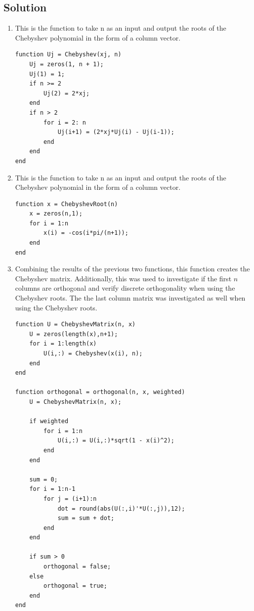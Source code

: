 \documentclass{article}
\begin{document}
\subsection{Solution}
\begin{enumerate}
    \item This is the function to take n as an input and output the roots of the Chebyshev polynomial in the form of a column vector.
    \begin{lstlisting}[style=Matlab-editor]
function Uj = Chebyshev(xj, n)
    Uj = zeros(1, n + 1);
    Uj(1) = 1;
    if n >= 2
        Uj(2) = 2*xj;
    end
    if n > 2
        for i = 2: n
            Uj(i+1) = (2*xj*Uj(i) - Uj(i-1));
        end
    end
end
    \end{lstlisting}
 \item This is the function to take n as an input and output the roots of the Chebyshev polynomial in the form of a column vector.
 \begin{lstlisting}[style=Matlab-editor]
function x = ChebyshevRoot(n)
    x = zeros(n,1);
    for i = 1:n
        x(i) = -cos(i*pi/(n+1));
    end
end
    \end{lstlisting}
\item Combining the results of the previous two functions, this function creates the Chebyshev matrix. Additionally, this was used to investigate if the first $n$ columns are orthogonal and verify discrete orthogonality when using the Chebyshev roots. The the last column matrix was investigated as well when using the Chebyshev roots.
    \begin{lstlisting}[style=Matlab-editor]
function U = ChebyshevMatrix(n, x)
    U = zeros(length(x),n+1);
    for i = 1:length(x)
        U(i,:) = Chebyshev(x(i), n);
    end
end

function orthogonal = orthogonal(n, x, weighted)
    U = ChebyshevMatrix(n, x);

    if weighted
        for i = 1:n
            U(i,:) = U(i,:)*sqrt(1 - x(i)^2);
        end
    end

    sum = 0;
    for i = 1:n-1
        for j = (i+1):n
            dot = round(abs(U(:,i)'*U(:,j)),12);
            sum = sum + dot;
        end
    end
    
    if sum > 0
        orthogonal = false;
    else
        orthogonal = true;
    end
end
    \end{lstlisting}
    

\end{enumerate}
\end{document}
